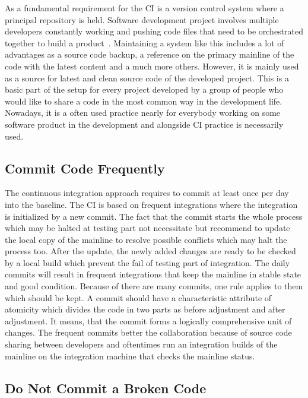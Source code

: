 As a fundamental requirement for the CI is a version control system where a principal repository is held. Software development project involves multiple developers constantly working and pushing code files that need to be orchestrated together to build a product~\cite{CI-BP1}. Maintaining a system like this includes a lot of advantages as a source code backup, a reference on the primary mainline of the code with the latest content and a much more others. However, it is mainly used as a source for latest and clean source code of the developed project. This is a basic part of the setup for every project developed by a group of people who would like to share a code in the most common way in the development life. Nowadays, it is a often used practice nearly for everybody working on some software product in the development and alongside CI practice is necessarily used.

\subsection{Commit Code Frequently}

The continuous integration approach requires to commit at least once per day into the baseline. The CI is based on frequent integrations where the integration is initialized by a new commit. The fact that the commit starts the whole process which may be halted at testing part not necessitate but recommend to update the local copy of the mainline to resolve possible conflicts which may halt the process too. After the update, the newly added changes are ready to be checked by a local build which prevent the fail of testing part of integration. The daily commits will result in frequent integrations that keep the mainline in stable state and good condition. Because of there are many commits, one rule applies to them which should be kept. A commit should have a characteristic attribute of atomicity which divides the code in two parts as before adjustment and after adjustment. It means, that the commit forms a logically comprehensive unit of changes. The frequent commits better the collaboration because of source code sharing between developers and oftentimes run an integration builds of the mainline on the integration machine that checks the mainline status.

\subsection{Do Not Commit a Broken Code}

